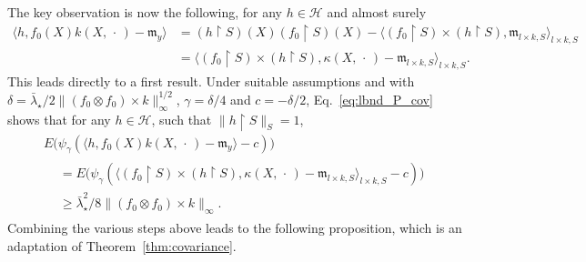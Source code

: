 \documentclass[10pt]{amsart}
\theoremstyle{definition}\newtheorem{defi}[theo]{Definition}\newtheorem{rema}[theo]{Remark}\newtheorem{exam}[theo]{Example}\newtheorem{exem}[theo]{Example}\newtheorem{nota}[theo]{Notation}
\theoremstyle{remark}
\newcommand{\restr}
{\!\!\upharpoonright\!}
\newcommand{\cH}{\mathcal{H}}
\newcommand{\mean}{\mathfrak{m}}
\newcounter{setofstep}
\newcounter{step}[setofstep]
\begin{document}
The key observation is now the following, for any $h \in \cH$ and almost surely
\begin{align*}
\bigl\langle h, f_0(X) k(X,\,\cdot\,) - \mean_y \bigr\rangle &= (h \restr S)(X) (f_0 \restr S)(X) - \bigl\langle (f_0 \restr S)\times (h\restr S), \mean_{l\times k,S} \bigr\rangle_{l\times k, S} \\
&= \bigl\langle (f_0 \restr S) \times (h \restr S), \kappa(X,\,\cdot\,) - \mean_{l\times k,S} \bigr\rangle_{l\times k, S}.
\end{align*}
This leads directly to a first result. Under suitable assumptions and with $\delta = \bar \lambda_\star/2 \|(f_0 \otimes f_0) \times k\|_\infty^{1/2}$, $\gamma = \delta/4$ and $c = - \delta/2$, Eq.~\eqref{eq:lbnd_P_cov} shows that for any $h\in \cH$, such that $\|h\restr S\|_S=1$,
\begin{multline}
\label{eq:paley_zygmund_f_0}
E\bigl(\psi_\gamma(\langle h,f_0(X)k(X,\,\cdot\,) - \mean_y \rangle -c)\bigr)  \\
\begin{aligned}
&= E\bigl(\psi_\gamma(\langle (f_0 \restr S) \times (h \restr S), \kappa(X,\,\cdot\,) - \mean_{l\times k,S} \rangle_{l\times k, S} - c)\bigr)  \\
&\geq \bar \lambda_\star^2/8\|(f_0 \otimes f_0) \times k\|_\infty.
\end{aligned}
\end{multline}
Combining the various steps above leads to the following proposition, which is an adaptation of Theorem~\ref{thm:covariance}.
\end{document}
